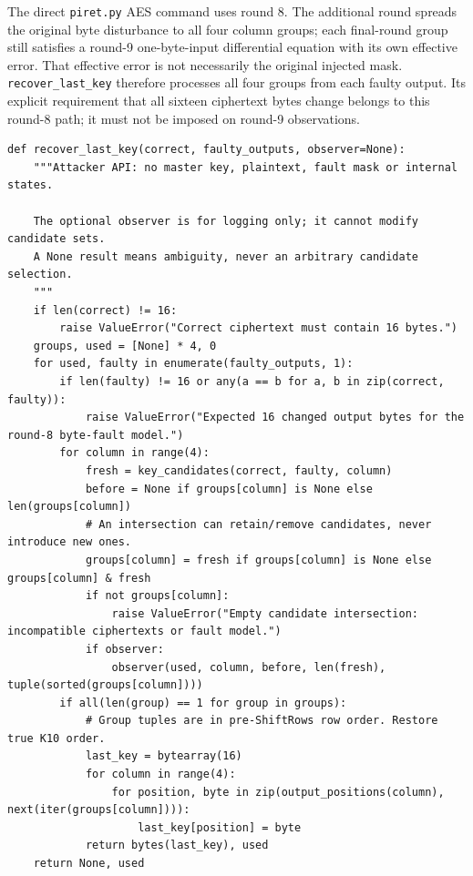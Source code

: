 \documentclass[11pt,a4paper]{report}
\begin{document}
The direct \texttt{piret.py} AES command uses round 8. The additional round spreads the original byte disturbance to all four column groups; each final-round group still satisfies a round-9 one-byte-input differential equation with its own effective error. That effective error is not necessarily the original injected mask. \texttt{recover\_last\_key} therefore processes all four groups from each faulty output. Its explicit requirement that all sixteen ciphertext bytes change belongs to this round-8 path; it must not be imposed on round-9 observations.
\begin{lstlisting}[style=pycode,caption={Round-8 AES recovery: intersect all four output groups}]
def recover_last_key(correct, faulty_outputs, observer=None):
    """Attacker API: no master key, plaintext, fault mask or internal states.

    The optional observer is for logging only; it cannot modify candidate sets.
    A None result means ambiguity, never an arbitrary candidate selection.
    """
    if len(correct) != 16:
        raise ValueError("Correct ciphertext must contain 16 bytes.")
    groups, used = [None] * 4, 0
    for used, faulty in enumerate(faulty_outputs, 1):
        if len(faulty) != 16 or any(a == b for a, b in zip(correct, faulty)):
            raise ValueError("Expected 16 changed output bytes for the round-8 byte-fault model.")
        for column in range(4):
            fresh = key_candidates(correct, faulty, column)
            before = None if groups[column] is None else len(groups[column])
            # An intersection can retain/remove candidates, never introduce new ones.
            groups[column] = fresh if groups[column] is None else groups[column] & fresh
            if not groups[column]:
                raise ValueError("Empty candidate intersection: incompatible ciphertexts or fault model.")
            if observer:
                observer(used, column, before, len(fresh), tuple(sorted(groups[column])))
        if all(len(group) == 1 for group in groups):
            # Group tuples are in pre-ShiftRows row order. Restore true K10 order.
            last_key = bytearray(16)
            for column in range(4):
                for position, byte in zip(output_positions(column), next(iter(groups[column]))):
                    last_key[position] = byte
            return bytes(last_key), used
    return None, used
\end{lstlisting}
\end{document}
